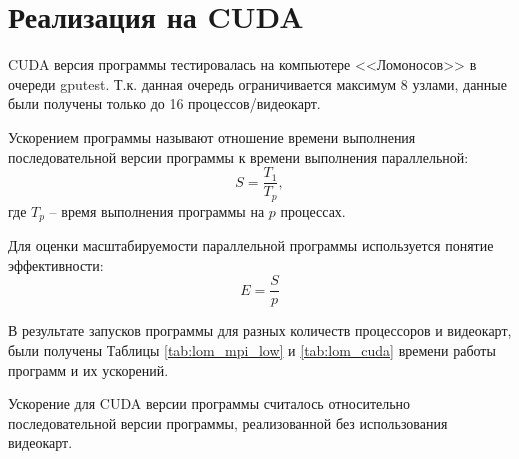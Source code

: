 \documentclass[12pt, a4paper]{article}
\begin{document}
    \section{Реализация на CUDA}
        CUDA версия программы тестировалась на компьютере <<Ломоносов>> в очереди gputest. Т.к. данная очередь ограничивается максимум 8 узлами, данные были получены только до 16 процессов/видеокарт.

        Ускорением программы называют отношение времени выполнения последовательной версии программы к времени выполнения параллельной:
        $$S = \frac{T_1}{T_p},$$
        где $T_p$ -- время выполнения программы на $p$ процессах.

        Для оценки масштабируемости параллельной программы используется понятие эффективности:
        $$E = \frac{S}{p}$$

        В результате запусков программы для разных количеств процессоров и видеокарт, были получены Таблицы \ref{tab:lom_mpi_low} и \ref{tab:lom_cuda} времени работы программ и их ускорений.

        Ускорение для CUDA версии программы считалось относительно последовательной версии программы, реализованной без использования видеокарт.
\end{document}
